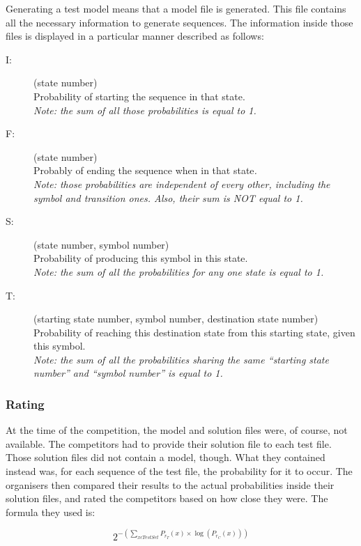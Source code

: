 Generating a test model means that a model file is generated. This
file contains all the necessary information to generate sequences.
The information inside those files is displayed in a particular manner
described as follows:
\begin{description}
\item [{I:}] (state number)\\
Probability of starting the sequence in that state.\\
\textit{Note: the sum of all those probabilities is equal to 1.}
\item [{F:}] (state number)\\
Probably of ending the sequence when in that state\textit{.}\\
\textit{Note: those probabilities are independent of every other,
including the symbol and transition ones. Also, their sum is NOT equal
to 1.}
\item [{S:}] (state number, symbol number)\\
Probability of producing this symbol in this state.\\
\textit{Note: the sum of all the probabilities for any one state is
equal to 1.}
\item [{T:}] (starting state number, symbol number, destination state number)\\
Probability of reaching this destination state from this starting
state, given this symbol.\\
\textit{Note: the sum of all the probabilities sharing the same ``starting
state number'' and ``symbol number'' is equal to 1.}
\end{description}

\subsubsection{Rating}

At the time of the competition, the model and solution files were,
of course, not available. The competitors had to provide their solution
file to each test file. Those solution files did not contain a model,
though. What they contained instead was, for each sequence of the
test file, the probability for it to occur. The organisers then compared
their results to the actual probabilities inside their solution files,
and rated the competitors based on how close they were. The formula
they used is:

\[
2^{-(\sum_{x\epsilon TestSet}P_{r_{T}}(x)\times\log(P_{r_{C}}(x)))}
\]


